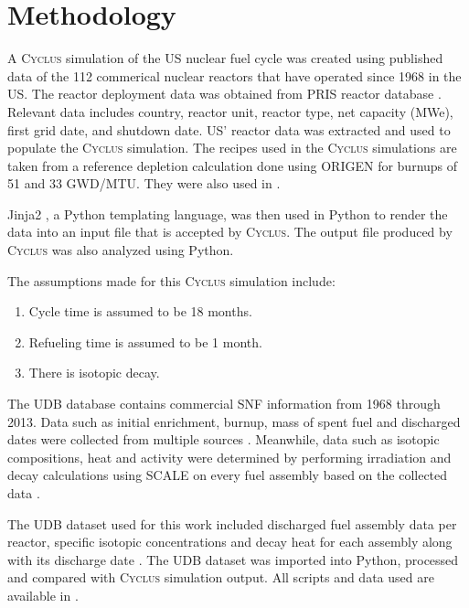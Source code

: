 \documentclass{anstrans}
\newcommand{\Cyclus}{\textsc{Cyclus}\xspace}%
\begin{document}
\section{Methodology}
A \Cyclus simulation of the \gls{US} nuclear fuel cycle was created using 
published data of the 112 commerical nuclear reactors that have operated since 
1968 in the \gls{US}. The reactor deployment data was obtained from \gls{PRIS} 
reactor database \cite{IAEA_pris_2017}.  Relevant data includes country, 
reactor unit, reactor type, net capacity (MWe), first grid date, and shutdown 
date. \gls{US}' reactor data was extracted and used to populate the \Cyclus 
simulation. The recipes used in the \Cyclus simulations are taken from a 
reference depletion calculation done using ORIGEN \cite{bell_origen_1973} for 
burnups of 51 and 33 GWD/MTU. They were also used in 
\cite{wilson_adoption_2009, bae_synergistic_2017}. 

Jinja2 \cite{ronacher_welcome_2018}, a Python templating language, was then 
used in Python to render the data into an input file that is accepted by 
\Cyclus. The output file produced by \Cyclus was also analyzed using Python. 

The assumptions made for this \Cyclus simulation include: 

\begin{enumerate}[topsep=0pt,itemsep=-1ex,partopsep=1ex,parsep=1ex]
	\item Cycle time is assumed to be 18 months. 
	\item Refueling time is assumed to be 1 month. 
	\item There is isotopic decay. 
\end{enumerate}

The \gls{UDB} database contains commercial \gls{SNF} information from 1968 through 2013. 
Data such as initial enrichment, burnup, mass of spent fuel and discharged 
dates were collected from multiple sources \cite{peterson_additional_2017}. 
Meanwhile, data such as isotopic compositions, heat and activity were determined 
by performing irradiation and decay calculations using SCALE on every fuel assembly based 
on the collected data \cite{peterson_additional_2017}. 

The \gls{UDB} dataset used for this work included discharged fuel assembly data per 
reactor, specific isotopic concentrations and decay heat for each assembly 
along with its discharge date \cite{peterson_unf-st&dards_2017}. The \gls{UDB} 
dataset was imported into Python, processed and compared with \Cyclus 
simulation output. All scripts and data used are available in 
\cite{chee_arfc/transition-scenarios_2018}. 
\end{document}

